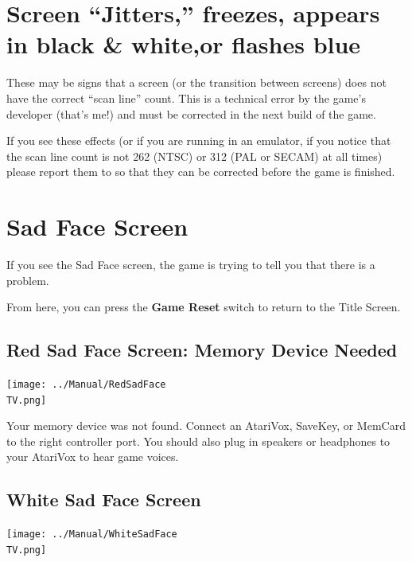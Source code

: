 \documentclass[10pt,twocolumn,openany,article]{memoir}
\newcommand\TV{NTSC} %
\begin{document}
\ifdefined\DEMO

\section*{Screen ``Jitters,'' freezes,  \ifdefined\TVPAL appears in black
  \& white,\fi or flashes blue}

These may  be signs that  a screen  (or the transition  between screens)
does not have the correct ``scan line'' count. This is a technical error
by the game's  developer (that's me!) and must be  corrected in the next
build of the game.

If you see these  effects (or if you are running in  an emulator, if you
notice that the scan line count is  not 262 (NTSC) or 312 (PAL or SECAM)
at       all       times)        please       report       them       to
 so  that they
can be corrected before the game is finished.

\fi

\section*{Sad Face Screen}

If you  see the Sad  Face screen,  the game is  trying to tell  you that
there is a problem.

From here, you can press the \textbf{Game Reset} switch to return to the
Title Screen.

\ifdefined\ATARIAGESAVE\else\ifdefined\NOSAVE\else

\subsection{Red Sad Face Screen: Memory Device Needed}

\texttt{[image: ../Manual/RedSadFace\\TV.png]}

Your  memory device  was not  found.  Connect an  AtariVox, SaveKey,  or
MemCard to the  right controller port. You should also  plug in speakers
or headphones to your AtariVox to hear game voices.

\fi\fi

\subsection{White Sad Face Screen}

\texttt{[image: ../Manual/WhiteSadFace\\TV.png]}
\end{document}
